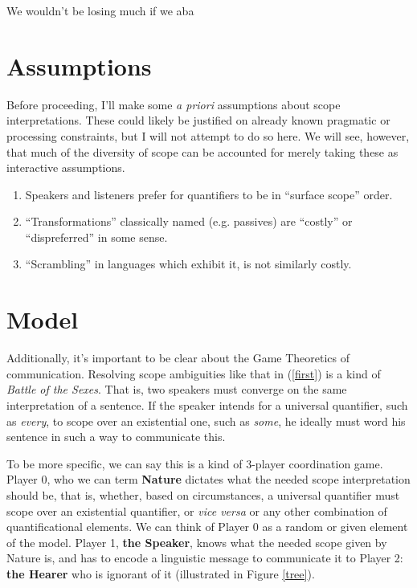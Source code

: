 \documentclass{article}
\begin{document}
We wouldn't be losing much if we aba

\section{Assumptions}


Before proceeding, I'll make some \emph{a priori} assumptions about scope interpretations.
These could likely be justified on already known pragmatic or processing constraints, but I will not attempt to do so here.
We will see, however, that much of the diversity of scope can be accounted for merely taking these as interactive assumptions.

\begin{enumerate}
\item Speakers and listeners prefer for quantifiers to be in ``surface scope'' order.
\item ``Transformations'' classically named (e.g. passives) are ``costly'' or ``dispreferred'' in some sense.
\item ``Scrambling'' in languages which exhibit it, is not similarly costly.
\end{enumerate}


\section{Model}

Additionally, it's important to be clear about the Game Theoretics of communication.
Resolving scope ambiguities like that in (\ref{first}) is a kind of \emph{Battle of the Sexes}.
That is, two speakers must converge on the same interpretation of a sentence.
If the speaker intends for a universal quantifier, such as \emph{every}, to scope over an existential one, such as \emph{some}, he ideally must word his sentence in such a way to communicate this.

To be more specific, we can say this is a kind of 3-player coordination game.
Player 0, who we can term \textbf{Nature} dictates what the needed scope interpretation should be, that is, whether, based on circumstances, a universal quantifier must scope over an existential quantifier, or \emph{vice versa} or any other combination of quantificational elements.
We can think of Player 0 as a random or given element of the model.
Player 1, \textbf{the Speaker}, knows what the needed scope given by Nature is, and has to encode a linguistic message to communicate it to Player 2: \textbf{the Hearer} who is ignorant of it (illustrated in Figure \ref{tree}).
\end{document}
